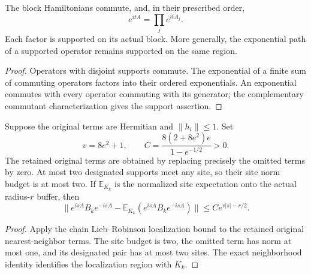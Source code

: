 \begin{lemma}
    \label{thm:huang_grid_exact_evolution}
    \leanok
    The block Hamiltonians commute, and, in their prescribed order,
    \[
        e^{itA}=\prod_j e^{itA_j}.
    \]
    Each factor is supported on its actual block. More generally, the exponential
    path of a supported operator remains supported on the same region.
\end{lemma}
\begin{proof}
    \leanok
    Operators with disjoint supports commute. The exponential of a finite sum of
    commuting operators factors into their ordered exponentials. An exponential
    commutes with every operator commuting with its generator; the complementary
    commutant characterization gives the support assertion.
\end{proof}

\begin{lemma}
    \label{thm:huang_grid_generator_localization}
    \leanok
    Suppose the original terms are Hermitian and $\|h_i\|\le1$. Set
    \[
        v=8e^2+1,\qquad C=\frac{8(2+8e^2)e}{1-e^{-1/2}}>0.
    \]
    The retained original terms are obtained by replacing precisely the omitted
    terms by zero. At most two designated supports meet any site, so their site
    norm budget is at most two. If $\mathbb E_{K_k}$ is the normalized site expectation
    onto the actual radius-$r$ buffer, then
    \[
        \|e^{isA}B_ke^{-isA}-\mathbb E_{K_k}(e^{isA}B_ke^{-isA})\|
        \le C e^{v|s|-r/2}.
    \]
\end{lemma}
\begin{proof}
    \leanok
    Apply the chain Lieb--Robinson localization bound to the retained original
    nearest-neighbor terms. The site budget is two, the omitted term has norm at
    most one, and its designated pair has at most two sites. The exact neighborhood
    identity identifies the localization region with $K_k$.
\end{proof}

